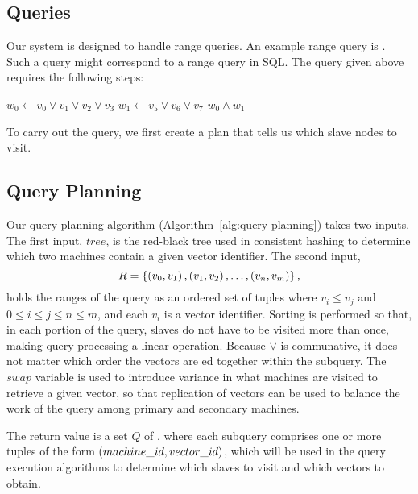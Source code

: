 \subsection{Queries}
Our system is designed to handle range queries. An example range query is
. Such a query might correspond to a range query in SQL.
The query given above requires the following steps:
\begin{algorithmic}
    \State $w_0 \gets v_0 \lor v_1 \lor v_2 \lor v_3$
    \State $w_1 \gets v_5 \lor v_6 \lor v_7$
    \State \Return $w_0 \land w_1$
\end{algorithmic}
To carry out the query, we first create a plan that tells us which slave nodes
to visit.
\subsection{Query Planning}
Our query planning algorithm (Algorithm~\ref{alg:query-planning}) takes two
inputs. The first input, \(tree\), is the red-black tree used in consistent
hashing to determine which two machines contain a given vector identifier. The
second input,
\[R = \left\{\left(v_0, v_1\right), \left(v_1, v_2\right), \ldots, \left(v_n, v_m\right)\right\},\]
holds the ranges of the query as an ordered set of tuples where
\(v_i \leq v_j\) and \(0 \leq i \leq j \leq n \leq m\), and each \(v_i\) is a
vector identifier. Sorting is performed so that, in each portion of the query,
slaves do not have to be visited more than once, making query processing
a linear operation. Because \(\lor\) is communative, it does not matter which
order the vectors are ed together within the subquery. The \(swap\) variable is used
to introduce variance in what machines are visited to retrieve a given vector, so
that replication of vectors can be used to balance the work of the query among
primary and secondary machines.\par The return value is
a set $Q$ of , where each subquery comprises one or more tuples
of the form \(\left(machine\_id,vector\_id\right)\), which will be used in
the query execution algorithms to determine which slaves to visit
and which vectors to obtain.
%
